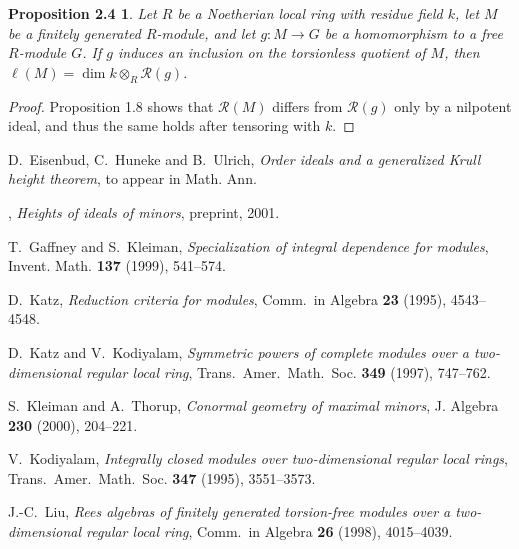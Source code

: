 \documentclass{proc-l}
\theoremstyle{plain}
\newtheorem*{theorem9}{Proposition 2.4}
\theoremstyle{definition}
\newcommand{\R}{\mathcal R}
\begin{document}
\begin{theorem9} Let $R$ be a Noetherian local ring with
residue field $k$, let $M$ be a finitely generated $R$-module,
and let $g \colon M\to G$ be a homomorphism to a free $R$-module
$G$. If $g$ induces an inclusion on the torsionless quotient of
$M$, then $\ell (M)=\dim k\otimes _{R}\R (g)$.
\end{theorem9}


\begin{proof} Proposition 1.8 shows that $\R (M)$ differs from
$\R (g)$ only by a nilpotent ideal, and thus the same holds after
tensoring with $k$. \end{proof}


 

\begin{thebibliography}{EHU1}




D.~Eisenbud, C.~Huneke and B.~Ulrich, {\em Order
ideals and a generalized Krull height theorem}, to appear in Math. Ann. 


\bysame , {\em Heights of ideals of minors}, preprint, 2001.



T.~Gaffney and S.~Kleiman, {\em Specialization of
integral dependence for modules}, Invent. Math. {\bf 137} (1999), 541--574.



D.~Katz, {\em Reduction criteria for modules}, Comm.~in Algebra {\bf 23}
(1995), 4543--4548. 



D.~Katz and V.~Kodiyalam, {\em Symmetric powers of
complete modules over a two-dimensional regular local ring},
Trans.~Amer.~Math.~Soc. {\bf 349} (1997), 747--762. 



 S.~Kleiman and A.~Thorup, {\em Conormal geometry of maximal
minors}, J. Algebra {\bf 230} (2000), 204--221. 



 V.~Kodiyalam, {\em Integrally closed modules over
two-dimensional regular local rings}, Trans.~Amer.~Math.~Soc. {\bf 347} (1995),
3551--3573. 



 J.-C.~Liu, {\em Rees algebras of finitely generated torsion-free
modules over a two-dimensional regular local ring}, Comm.~in Algebra {\bf 26}
(1998), 4015--4039. 




\end{thebibliography}
\end{document}
